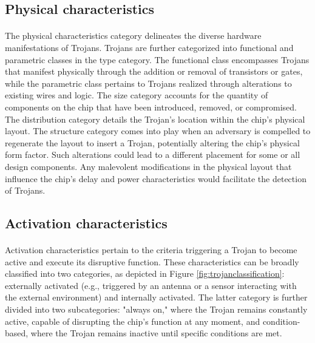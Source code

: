 \subsection*{Physical characteristics}
\paragraph*{}
The physical characteristics category delineates the diverse hardware manifestations of Trojans. Trojans are further categorized into functional and parametric classes in the type category. The functional class encompasses Trojans that manifest physically through the addition or removal of transistors or gates, while the parametric class pertains to Trojans realized through alterations to existing wires and logic. The size category accounts for the quantity of components on the chip that have been introduced, removed, or compromised. The distribution category details the Trojan's location within the chip's physical layout. The structure category comes into play when an adversary is compelled to regenerate the layout to insert a Trojan, potentially altering the chip's physical form factor. Such alterations could lead to a different placement for some or all design components. Any malevolent modifications in the physical layout that influence the chip's delay and power characteristics would facilitate the detection of Trojans.
\subsection*{Activation characteristics}
\paragraph*{}
Activation characteristics pertain to the criteria triggering a Trojan to become active and execute its disruptive function. These characteristics can be broadly classified into two categories, as depicted in Figure \ref{fig:trojanclassification}: externally activated (e.g., triggered by an antenna or a sensor interacting with the external environment) and internally activated. The latter category is further divided into two subcategories: "always on," where the Trojan remains constantly active, capable of disrupting the chip's function at any moment, and condition-based, where the Trojan remains inactive until specific conditions are met.

